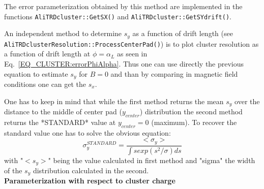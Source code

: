 \documentclass{alicetdr}
\begin{document}
The error parameterization obtained by this method are implemented in the functions
{\tt AliTRD\-cluster::GetSX()} and {\tt AliTRDcluster::GetSYdrift()}.

An independent method to determine $s_y$ as a function of drift length (see
{\tt AliTRDcluster\-Resolution::ProcessCenterPad()}) is to plot cluster resolution as
a function of drift length at $\phi = \alpha_L$ as seen in
Eq.~\ref{EQ_CLUSTER:errorPhiAlpha}. Thus one can use directly the previous equation
to estimate $s_y$ for $B = 0$ and than by comparing in magnetic field conditions one
can get the $s_x$.

One has to keep in mind that while the first method returns the mean $s_y$ over the
distance to the middle of center pad ($y_{center}$) distribution the second method
returns the *STANDARD* value at $y_{center}=0$ (maximum). To recover the standard
value one has to solve the obvious equation:
\begin{equation}
\sigma_{y}^{STANDARD} = \frac{<\sigma_{y}>}{\int{s exp(s^{2}/\sigma) ds}}
\end{equation}
with "$<s_y>$" being the value calculated in first method and "sigma" the width of
the $s_y$ distribution calculated in the second.
\\

\noindent
{\bf Parameterization with respect to cluster charge}
\\
\end{document}
